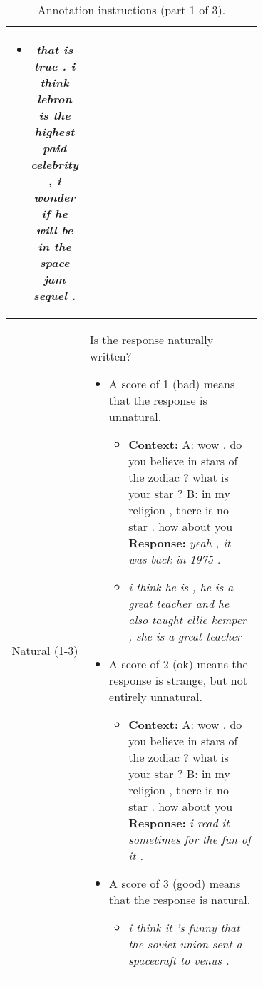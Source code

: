 \documentclass[11pt,a4paper]{article}
\begin{document}
\begin{table*}
\begin{tabular}{|c|p{0.7\linewidth}|}
\begin{itemize}
\begin{itemize}
                \item \textit{that is true . i think lebron is the highest paid celebrity , i wonder if he will be in the space jam sequel .}
            \end{itemize}
        \end{itemize} \\ \hline
        Natural (1-3) &  Is the response naturally written?
        \begin{itemize}
            \item A score of 1 (bad) means that the response is unnatural. \begin{itemize}
                \item \textbf{Context:} A: wow . do you believe in stars of the zodiac ? what is your star ? B: in my religion , there is no star . how about you \textbf{Response:} \textit{yeah , it was back in 1975 .}
                \item \textit{i think he is , he is a great teacher and he also taught ellie kemper , she is a great teacher}

            \end{itemize}
            \item A score of 2 (ok) means the response is strange, but not entirely unnatural. \begin{itemize}
                \item \textbf{Context:} A: wow . do you believe in stars of the zodiac ? what is your star ? B: in my religion , there is no star . how about you \textbf{Response:} \textit{i read it sometimes for the fun of it .}
            \end{itemize}
            \item A score of 3 (good) means that the response is natural.  \begin{itemize}
                \item \textit{i think it 's funny that the soviet union sent a spacecraft to venus .}
            \end{itemize}            
        \end{itemize} \\ \hline

    \end{tabular}
    \caption{Annotation instructions (part 1 of 3).}
\end{table*}
\end{document}

